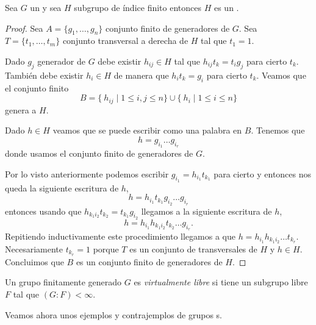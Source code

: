 \documentclass[tesis.tex]{subfiles}
\begin{document}
\begin{lema}\label{lema_subg_fg}
	Sea $G$ un \fg y sea $H$ subgrupo de índice finito entonces $H$ es un \fg.
\end{lema}
\begin{proof}
	Sea $A = \{g_1, \dots, g_n\}$ conjunto finito de generadores de $G$.
	Sea $T =\{t_1, \dots, t_m\}$ conjunto transversal a derecha de $H$ tal que $t_1=1$.
	
	Dado $g_j$ generador de $G$ debe existir $h_{ij} \in H$ tal que $h_{ij}t_{k} = t_ig_j$ para cierto $t_k$.
	También debe existir $h_i \in H$ de manera que $ h_i t_{k} = g_i$ para cierto $t_k$.
	Veamos que el conjunto finito 
	\[
	B = \{ \ h_{ ij}  \mid {1 \le i,j \le n } \} \cup \{ \ h_i \mid {1 \le i \le n} \}
	\]
	genera a $H$.
	
	Dado $h \in H$ veamos que se puede escribir como una palabra en $B$. 
	Tenemos que 
	\[
	h = g_{i_1}\dots g_{i_r}
	\]
	donde usamos el conjunto finito de generadores de $G$.
	
	Por lo visto anteriormente podemos escribir  $g_{i_1} = h_{i_1}t_{k_1}$ para cierto y entonces nos queda la siguiente escritura de $h$,
	\[
	h = h_{i_1}t_{k_1} g_{i_2}\dots g_{i_r}
	\]
	entonces usando que $h_{k_{1}i_{2}}t_{k_2} = t_{k_1}g_{i_2} $ llegamos a la siguiente escritura de $h$,
	\[
	h = h_{i_1}h_{k_{1}i_{2}}t_{k_2}\dots g_{i_r}.
	\]
	Repitiendo inductivamente este procedimiento llegamos a que $h =h_{i_1}h_{k_{1}i_{2}} \dots t_{k_r}$.
	Necesariamente $t_{k_r} = 1$ porque $T$ es un conjunto de transversales de $H$ y $h \in H$.
	Concluimos que $B$ es un conjunto finito de generadores de $H$.
	
\end{proof}

\begin{deff}
	Un grupo finitamente generado $G$ es \emph{virtualmente libre} si tiene un subgrupo libre $F$ tal que $(G:F) < \infty$.
\end{deff}



Veamos ahora unos ejemplos y contrajemplos de grupos \vl s.
\end{document}
